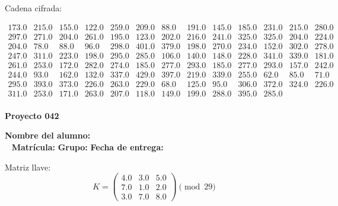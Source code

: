 \documentclass[12pt]{article}
\begin{document}
Cadena cifrada:
\begin{center}
$\begin{array}{lllllllllllll}
173.0 & 215.0 & 155.0 & 122.0 & 259.0 & 209.0 & 88.0 & 191.0 & 145.0 & 185.0 & 231.0 & 215.0 & 280.0\\
297.0 & 271.0 & 204.0 & 261.0 & 195.0 & 123.0 & 202.0 & 216.0 & 241.0 & 325.0 & 325.0 & 204.0 & 224.0\\
204.0 & 78.0 & 88.0 & 96.0 & 298.0 & 401.0 & 379.0 & 198.0 & 270.0 & 234.0 & 152.0 & 302.0 & 278.0\\
247.0 & 311.0 & 223.0 & 198.0 & 295.0 & 285.0 & 106.0 & 140.0 & 148.0 & 228.0 & 341.0 & 339.0 & 181.0\\
261.0 & 253.0 & 172.0 & 282.0 & 274.0 & 185.0 & 277.0 & 293.0 & 185.0 & 277.0 & 293.0 & 157.0 & 242.0\\
244.0 & 93.0 & 162.0 & 132.0 & 337.0 & 429.0 & 397.0 & 219.0 & 339.0 & 255.0 & 62.0 & 85.0 & 71.0\\
295.0 & 393.0 & 373.0 & 226.0 & 263.0 & 229.0 & 68.0 & 125.0 & 95.0 & 306.0 & 372.0 & 324.0 & 226.0\\
311.0 & 253.0 & 171.0 & 263.0 & 207.0 & 118.0 & 149.0 & 199.0 & 288.0 & 395.0 & 285.0\\
\end{array}$
\end{center}

\newpage


\textbf{Proyecto 042}

\textbf{Nombre del alumno:} \underline{\hspace{13cm}}\\\
\vspace{1cm}
\textbf{Matrícula:} \underline{\hspace{4cm}} \hspace{1cm}
\textbf{Grupo:} \underline{\hspace{2cm}}
\textbf{Fecha de entrega:} \underline{\hspace{2cm}}

\medskip

Matriz llave:
\[
K = \begin{pmatrix}
4.0 & 3.0 & 5.0\\
7.0 & 1.0 & 2.0\\
3.0 & 7.0 & 8.0
\end{pmatrix} \pmod{29}
\]
\end{document}

